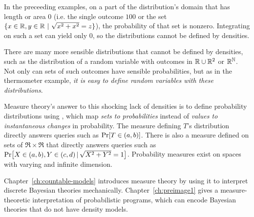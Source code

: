 In the preceeding examples, on a part of the distribution's domain that has length or area $0$ (i.e. the single outcome $100$ or the set $\lbrace {x \in \mathbb{R}, y \in \mathbb{R}} \ \lvert\ {\sqrt{x^2+x^2} = z} \rbrace$), the probability of that set is nonzero.
Integrating on such a set can yield only $0$, so the distributions cannot be defined by densities.

There are many more sensible distributions that cannot be defined by densities, such as the distribution of a random variable with outcomes in $\mathbb{R} \cup \mathbb{R}^2$ or $\mathbb{R}^{\mathbb{N}}$.
Not only can sets of such outcomes have sensible probabilities, but as in the thermometer example, \emph{it is easy to define random variables with these distributions}.

Measure theory's answer to this shocking lack of densities is to define probability distributions using , which map \emph{sets to probabilities} instead of \emph{values to instantaneous changes} in probability.
The measure defining $T$'s distribution directly answers queries such as $\mathrm{Pr}\!\left[{T \in (a,b)}\right]$.
There is also a measure defined on sets of $\Re \times \Re$ that directly answers queries such as $\mathrm{Pr}\!\left[{X \in (a,b),Y \in (c,d) \,|\, \sqrt{X^2 + Y^2} = 1}\right]$.
Probability measures exist on spaces with varying and infinite dimension.

Chapter~\ref{ch:countable-models} introduces measure theory by using it to interpret discrete Bayesian theories mechanically.
Chapter~\ref{ch:preimage1} gives a measure-theoretic interpretation of probabilistic programs, which can encode Bayesian theories that do not have density models.

